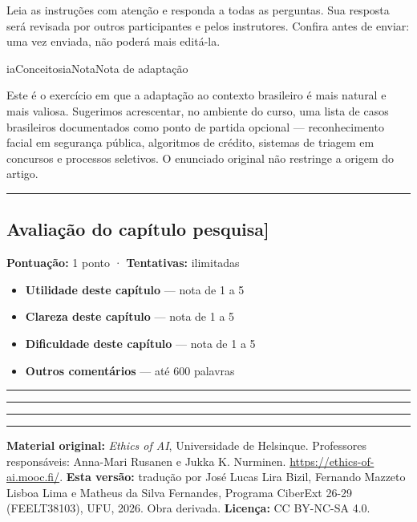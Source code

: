 \documentclass[
  11pt,
]{article}
\providecommand{\tightlist}{%
  \setlength{\itemsep}{0pt}\setlength{\parskip}{0pt}}
\newcommand{\faixaEixos}[1][\linewidth]{%
  \noindent
  \textcolor{iaConceitos}{\rule{0.3333#1}{4pt}}%
  \textcolor{iaAplic}{\rule{0.3333#1}{4pt}}%
  \textcolor{iaRiscos}{\rule{0.3333#1}{4pt}}%
  \par}
\renewcommand{\texttt}[1]{{\color{iaAmeixa}\small\ttfamily #1}}
\newenvironment{nota}[1][Nota]{\begin{iabox}{iaConceitos}{iaNota}{#1}}{\end{iabox}}
\newenvironment{licenca}
  {\par\vspace{2em}\faixaEixos\par\vspace{0.8em}
   \begingroup\sffamily\scriptsize\color{iaTintaFraca}}
  {\endgroup\par}
\begin{document}
Leia as instruções com atenção e responda a todas as perguntas. Sua
resposta será revisada por outros participantes e pelos instrutores.
Confira antes de enviar: uma vez enviada, não poderá mais editá-la.

\begin{nota}[Nota de adaptação]

Este é o exercício em que a adaptação ao contexto brasileiro é mais
natural e mais valiosa. Sugerimos acrescentar, no ambiente do curso, uma
lista de casos brasileiros documentados como ponto de partida opcional
--- reconhecimento facial em segurança pública, algoritmos de crédito,
sistemas de triagem em concursos e processos seletivos. O enunciado
original não restringe a origem do artigo.

\end{nota}

\begin{center}\rule{0.5\linewidth}{0.5pt}\end{center}

\hypertarget{avaliauxe7uxe3o-do-capuxedtulo-pesquisa}{%
\subsection{\texorpdfstring{Avaliação do capítulo
\texttt{{[}pesquisa{]}}}{Avaliação do capítulo {[}pesquisa{]}}}\label{avaliauxe7uxe3o-do-capuxedtulo-pesquisa}}

\textbf{Pontuação:} 1 ponto · \textbf{Tentativas:} ilimitadas

\begin{itemize}
\tightlist
\item
  \textbf{Utilidade deste capítulo} --- nota de 1 a 5
\item
  \textbf{Clareza deste capítulo} --- nota de 1 a 5
\item
  \textbf{Dificuldade deste capítulo} --- nota de 1 a 5
\item
  \textbf{Outros comentários} --- até 600 palavras
\end{itemize}

\begin{center}\rule{0.5\linewidth}{0.5pt}\end{center}

\begin{licenca}

\textbf{Material original:} \emph{Ethics of AI}, Universidade de
Helsinque. Professores responsáveis: Anna-Mari Rusanen e Jukka K.
Nurminen. \url{https://ethics-of-ai.mooc.fi/}. \textbf{Esta versão:}
tradução por José Lucas Lira Bizil, Fernando Mazzeto Lisboa Lima e
Matheus da Silva Fernandes, Programa CiberExt 26-29 (FEELT38103), UFU,
2026. Obra derivada. \textbf{Licença:} CC BY-NC-SA 4.0.

\end{licenca}
\end{document}
